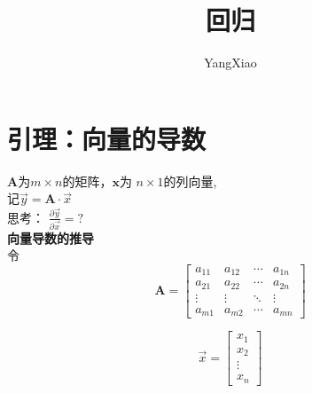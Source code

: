 \documentclass{ctexart}
\title {回归}
\author {YangXiao}
\begin{document}
\maketitle
\section{引理：向量的导数}
    $\bm A$为$m\times n$的矩阵，$\bm x$为 $n\times 1$的列向量,\\
    记$\vec{y} = \bm A\cdot\vec{x}$ \\
    思考： $\frac{\partial \vec{y}}{\partial \vec{x}} = ?$ \\
    \textbf{向量导数的推导} \\
    令 \\
    $$
    \bm A=
    \left[
    \begin{matrix}
      a_{11} & a_{12} & \cdots & a_{1n} \\
      a_{21} & a_{22} & \cdots & a_{2n} \\
      \vdots & \vdots & \ddots & \vdots \\
      a_{m1} & a_{m2} & \cdots & a_{mn}
    \end{matrix}
    \right]
    $$

    $$
    \vec{x}=
    \left[
    \begin{matrix}
      x_1 \\
      x_2 \\
      \vdots \\
      x_n
    \end{matrix}
    \right]
    $$
\end{document}

